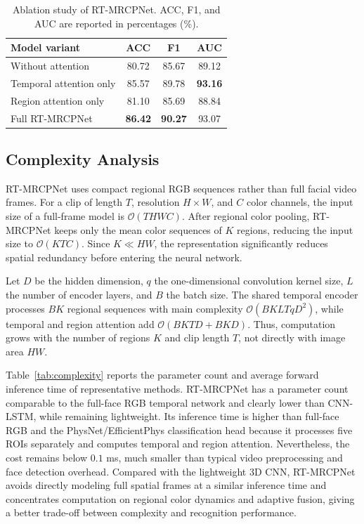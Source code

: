 \documentclass[runningheads]{llncs}
\begin{document}
\begin{table}[!htbp]
\caption{Ablation study of RT-MRCPNet. ACC, F1, and AUC are reported in percentages (\%).}
\label{tab:ablation}
\centering
\begin{tabular}{lccc}
\toprule
Model variant & ACC & F1 & AUC \\
\midrule
Without attention & 80.72 & 85.67 & 89.12 \\
Temporal attention only & 85.57 & 89.78 & \textbf{93.16} \\
Region attention only & 81.10 & 85.69 & 88.84 \\
Full RT-MRCPNet & \textbf{86.42} & \textbf{90.27} & 93.07 \\
\bottomrule
\end{tabular}
\end{table}

\subsection{Complexity Analysis}

RT-MRCPNet uses compact regional RGB sequences rather than full facial video frames. For a clip of length $T$, resolution $H \times W$, and $C$ color channels, the input size of a full-frame model is $\mathcal{O}(T H W C)$. After regional color pooling, RT-MRCPNet keeps only the mean color sequences of $K$ regions, reducing the input size to $\mathcal{O}(K T C)$. Since $K \ll H W$, the representation significantly reduces spatial redundancy before entering the neural network.

Let $D$ be the hidden dimension, $q$ the one-dimensional convolution kernel size, $L$ the number of encoder layers, and $B$ the batch size. The shared temporal encoder processes $B K$ regional sequences with main complexity $\mathcal{O}(B K L T q D^2)$, while temporal and region attention add $\mathcal{O}(B K T D + B K D)$. Thus, computation grows with the number of regions $K$ and clip length $T$, not directly with image area $H W$.

Table~\ref{tab:complexity} reports the parameter count and average forward inference time of representative methods. RT-MRCPNet has a parameter count comparable to the full-face RGB temporal network and clearly lower than CNN-LSTM, while remaining lightweight. Its inference time is higher than full-face RGB and the PhysNet/EfficientPhys classification head because it processes five ROIs separately and computes temporal and region attention. Nevertheless, the cost remains below $0.1$ ms, much smaller than typical video preprocessing and face detection overhead. Compared with the lightweight 3D CNN, RT-MRCPNet avoids directly modeling full spatial frames at a similar inference time and concentrates computation on regional color dynamics and adaptive fusion, giving a better trade-off between complexity and recognition performance.
\end{document}
